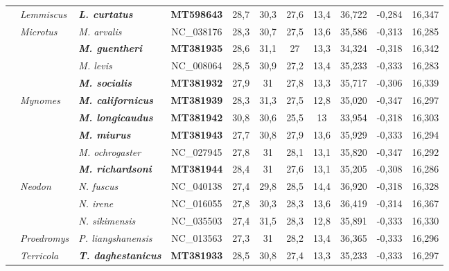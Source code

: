 \begin{landscape}
\begin{longtable}{|l|l|l|c|c|c|c|c|c|c|c|}
				& \textit{Lemmiscus} & \textit{\textbf{L. curtatus}} & \textbf{MT598643} & 28,7 & 30,3 & 27,6 & 13,4 & 36,722 & -0,284 & 16,347 \\ \cline{2-11} 
				& \multirow{4}{*}{\textit{Microtus}} & \textit{M. arvalis} & NC\_038176 & 28,3 & 30,7 & 27,5 & 13,6 & 35,586 & -0,313 & 16,285 \\ \cline{3-11} 
				&  & \textit{\textbf{M. guentheri}} & \textbf{MT381935} & 28,6 & 31,1 & 27 & 13,3 & 34,324 & -0,318 & 16,342 \\ \cline{3-11} 
				&  & \textit{M. levis} & NC\_008064 & 28,5 & 30,9 & 27,2 & 13,4 & 35,233 & -0,333 & 16,283 \\ \cline{3-11} 
				&  & \textit{\textbf{M. socialis}} & \textbf{MT381932} & 27,9 & 31 & 27,8 & 13,3 & 35,717 & -0,306 & 16,339 \\ \cline{2-11} 
				& \multirow{5}{*}{\textit{Mynomes}} & \textit{\textbf{M. californicus}} & \textbf{MT381939} & 28,3 & 31,3 & 27,5 & 12,8 & 35,020 & -0,347 & 16,297 \\ \cline{3-11} 
				&  & \textit{\textbf{M. longicaudus}} & \textbf{MT381942} & 30,8 & 30,6 & 25,5 & 13 & 33,954 & -0,318 & 16,303 \\ \cline{3-11} 
				&  & \textit{\textbf{M. miurus}} & \textbf{MT381943} & 27,7 & 30,8 & 27,9 & 13,6 & 35,929 & -0,333 & 16,294 \\ \cline{3-11} 
				&  & \textit{M. ochrogaster} & NC\_027945 & 27,8 & 31 & 28,1 & 13,1 & 35,820 & -0,347 & 16,292 \\ \cline{3-11} 
				&  & \textit{\textbf{M. richardsoni}} & \textbf{MT381944} & 28,4 & 31 & 27,6 & 13,1 & 35,205 & -0,308 & 16,286 \\ \cline{2-11} 
				& \multirow{3}{*}{\textit{Neodon}} & \textit{N. fuscus} & NC\_040138 & 27,4 & 29,8 & 28,5 & 14,4 & 36,920 & -0,318 & 16,328 \\ \cline{3-11} 
				&  & \textit{N. irene} & NC\_016055 & 27,8 & 30,3 & 28,3 & 13,6 & 36,419 & -0,314 & 16,367 \\ \cline{3-11} 
				&  & \textit{N. sikimensis} & NC\_035503 & 27,4 & 31,5 & 28,3 & 12,8 & 35,891 & -0,333 & 16,330 \\ \cline{2-11} 
				& \textit{Proedromys} & \textit{P. liangshanensis} & NC\_013563 & 27,3 & 31 & 28,2 & 13,4 & 36,365 & -0,333 & 16,296 \\ \cline{2-11} 
				& \multirow{2}{*}{\textit{Terricola}} & \textit{\textbf{T. daghestanicus}} & \textbf{MT381933} & 28,5 & 30,8 & 27,4 & 13,3 & 35,233 & -0,333 & 16,297 \\ \cline{3-11} 

\end{longtable}
\end{landscape}
